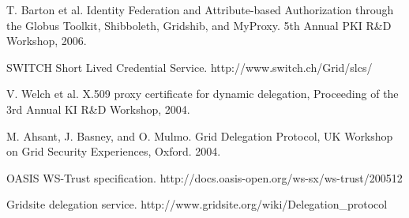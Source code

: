 \documentclass[conference]{IEEEtran}
\begin{document}
\begin{thebibliography}{1}
T. Barton et al. Identity Federation and Attribute-based Authorization through the Globus Toolkit, Shibboleth, Gridshib, and MyProxy. 5th Annual PKI R\&D Workshop, 2006.

SWITCH Short Lived Credential Service. http://www.switch.ch/Grid/slcs/

V. Welch et al. X.509 proxy certificate for dynamic delegation, Proceeding of the 3rd Annual KI R\&D Workshop, 2004.

M. Ahsant, J. Basney, and O. Mulmo. Grid Delegation Protocol, UK Workshop on Grid Security Experiences, Oxford. 2004.

OASIS WS-Trust specification. http://docs.oasis-open.org/ws-sx/ws-trust/200512

Gridsite delegation service. http://www.gridsite.org/wiki/Delegation\_protocol

\end{thebibliography}
\end{document}

